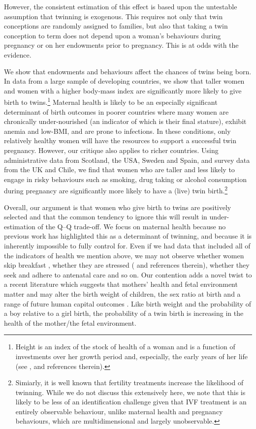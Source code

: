However, the consistent estimation of this effect is based upon the untestable 
assumption that twinning is exogenous. This requires not only that twin 
conceptions are randomly assigned to families, but also that taking a twin
conception to term does not depend upon a woman's behaviours during pregnancy 
or on her endowments prior to pregnancy. This is at odds with the evidence.

We show that endowments and behaviours affect the chances of twins being born. 
In data from a large sample of developing countries, we show that taller women 
and women with a higher body-mass index are significantly more likely to give 
birth to twins.\footnote{Height is an index of the stock of health of a woman 
and is a function of investments over her growth period and, especially, the 
early years of her life (see \citet{BhalotraRawlings2013}, and references 
therein).} Maternal health is likely to be an especially significant determinant 
of birth outcomes in poorer countries where many women are chronically 
under-nourished (an indicator of which is their final stature), exhibit anemia 
and low-BMI, and are prone to infections. In these conditions, only relatively 
healthy women will have the resources to support a successful twin pregnancy. 
However, our critique also applies to richer countries. Using administrative 
data from Scotland, the USA, Sweden and Spain, and survey data from the UK and 
Chile, we find that women who are taller and less likely to engage in risky 
behaviours such as smoking, drug taking or alcohol consumption during pregnancy 
are significantly more likely to have a (live) twin birth.\footnote{Simiarly, 
it is well known that fertility treatments increase the likelihood of twinning.
While we do not discuss this extensively here, we note that this is likely to 
be less of an identification challenge given that IVF treatment is an entirely 
observable behaviour, unlike maternal health and pregnancy behaviours, which are
multidimensional and largely unobservable.}

Overall, our argument is that women who give birth to twins are positively 
selected and that the common tendency to ignore this will result in under-%
estimation of the Q--Q trade-off. We focus on maternal health because no 
previous work has highlighted this as a determinant of twinning, and because it 
is inherently impossible to fully control for. Even if we had data that included 
all of the indicators of health we mention above, we may not observe whether 
women skip breakfast \citep{MazumderSeeskin2014}, whether they are stressed 
(\citet{Blacketal2014} and references therein), whether they seek and adhere to 
antenatal care and so on. Our contention adds a novel twist to a recent 
literature which suggests that mothers' health and fetal environment matter and 
may alter the birth weight of children, the sex ratio at birth and a range of 
future human capital outcomes \citep{Almondetal2011,BhalotraRawlings2013,
Barker1995}. Like birth weight and the probability of a boy relative to a girl 
birth, the probability of a twin birth is increasing in the health of the 
mother/the fetal environment.

